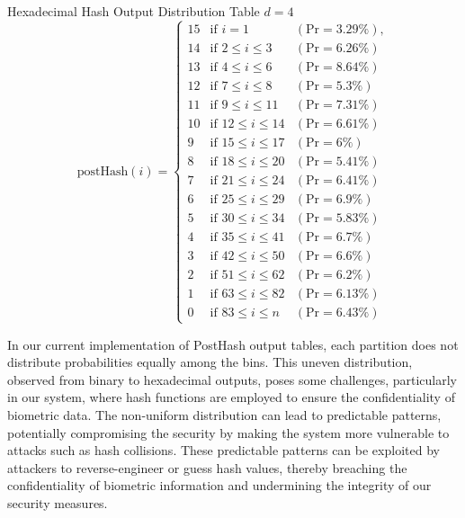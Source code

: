 Hexadecimal Hash Output Distribution Table \(d=4\)
{
\renewcommand{\arraystretch}{1.25}
\[
\text{postHash}(i) = \left\{
\begin{array}{lll}
    \text{15} & \text{if } i = 1 & (\text{Pr} = 3.29\%), \\
    \text{14} & \text{if } 2 \leq i \leq 3 & (\text{Pr} = 6.26\%) \\
    \text{13} & \text{if } 4 \leq i \leq 6 & (\text{Pr} = 8.64\%) \\
    \text{12} & \text{if } 7 \leq i \leq 8 & (\text{Pr} = 5.3\%) 
    \\
    \text{11} & \text{if } 9 \leq i \leq 11 & (\text{Pr} = 7.31\%) \\
    \text{10} & \text{if } 12 \leq i \leq 14 & (\text{Pr} = 6.61\%) \\
    \text{9} & \text{if } 15 \leq i \leq 17 & (\text{Pr} = 6\%) \\
    \text{8} & \text{if } 18 \leq i \leq 20 & (\text{Pr} = 5.41\%) \\
    \text{7} & \text{if } 21 \leq i \leq 24 & (\text{Pr} = 6.41\%) \\
    \text{6} & \text{if } 25 \leq i \leq 29 & (\text{Pr} = 6.9\%) \\
    \text{5} & \text{if } 30 \leq i \leq 34 & (\text{Pr} = 5.83\%) \\
    \text{4} & \text{if } 35 \leq i \leq 41 & (\text{Pr} = 6.7\%) \\
    \text{3} & \text{if } 42 \leq i \leq 50 & (\text{Pr} = 6.6\%) \\
    \text{2} & \text{if } 51 \leq i \leq 62 & (\text{Pr} = 6.2\%) \\
    \text{1} & \text{if } 63 \leq i \leq 82 & (\text{Pr} = 6.13\%) \\
    \text{0} & \text{if } 83 \leq i \leq n & (\text{Pr} = 6.43\%)
\end{array}
\right.
\]
}

In our current implementation of PostHash output tables, each partition does not distribute probabilities equally among the bins. This uneven distribution, observed from binary to hexadecimal outputs, poses some challenges, particularly in our system, where hash functions are employed to ensure the confidentiality of biometric data. The non-uniform distribution can lead to predictable patterns, potentially compromising the security by making the system more vulnerable to attacks such as hash collisions. These predictable patterns can be exploited by attackers to reverse-engineer or guess hash values, thereby breaching the confidentiality of biometric information and undermining the integrity of our security measures.

